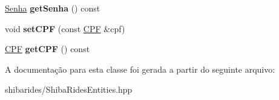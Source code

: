 \begin{DoxyCompactItemize}
\item 
\hyperlink{classshibarides_1_1Senha}{Senha} {\bfseries get\+Senha} () const \hypertarget{classshibarides_1_1Usuario_a17d84322766046fc4457cce62b35daf9}{}\label{classshibarides_1_1Usuario_a17d84322766046fc4457cce62b35daf9}

\item 
void {\bfseries set\+C\+PF} (const \hyperlink{classshibarides_1_1CPF}{C\+PF} \&cpf)\hypertarget{classshibarides_1_1Usuario_ad22e4cf193a09a935b33ee6bc1b5102d}{}\label{classshibarides_1_1Usuario_ad22e4cf193a09a935b33ee6bc1b5102d}

\item 
\hyperlink{classshibarides_1_1CPF}{C\+PF} {\bfseries get\+C\+PF} () const \hypertarget{classshibarides_1_1Usuario_a9710f4d8e7c3ae151ee45f164a147b0c}{}\label{classshibarides_1_1Usuario_a9710f4d8e7c3ae151ee45f164a147b0c}

\end{DoxyCompactItemize}


A documentação para esta classe foi gerada a partir do seguinte arquivo\+:\begin{DoxyCompactItemize}
\item 
shibarides/Shiba\+Rides\+Entities.\+hpp\end{DoxyCompactItemize}
